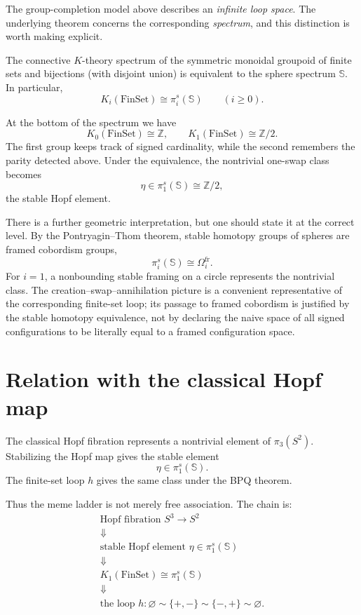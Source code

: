 The group-completion model above describes an \emph{infinite loop space}. The underlying theorem concerns the corresponding \emph{spectrum}, and this distinction is worth making explicit.

\begin{theorem}
The connective $K$-theory spectrum of the symmetric monoidal groupoid of finite sets and bijections (with disjoint union) is equivalent to the sphere spectrum $\mathbb S$. In particular,
\[
 K_i(\mathrm{FinSet})\cong\pi_i^s(\mathbb S)
 \qquad(i\ge0).
\]
\end{theorem}

At the bottom of the spectrum we have
\[
 K_0(\mathrm{FinSet})\cong\mathbb Z,\qquad
 K_1(\mathrm{FinSet})\cong\mathbb Z/2.
\]
The first group keeps track of signed cardinality, while the second remembers the parity detected above. Under the equivalence, the nontrivial one-swap class becomes
\[
 \eta\in\pi_1^s(\mathbb S)\cong\mathbb Z/2,
\]
the stable Hopf element.

There is a further geometric interpretation, but one should state it at the correct level. By the Pontryagin--Thom theorem, stable homotopy groups of spheres are framed cobordism groups,
\[
 \pi_i^s(\mathbb S)\cong\Omega_i^{\mathrm{fr}}.
\]
For $i=1$, a nonbounding stable framing on a circle represents the nontrivial class. The creation--swap--annihilation picture is a convenient representative of the corresponding finite-set loop; its passage to framed cobordism is justified by the stable homotopy equivalence, not by declaring the naive space of all signed configurations to be literally equal to a framed configuration space.

\section{Relation with the classical Hopf map}

The classical Hopf fibration represents a nontrivial element of \(\pi_3(S^2)\).  Stabilizing the Hopf map gives the stable element
\[
  \eta\in \pi_1^s(\mathbb S).
\]
The finite-set loop \(h\) gives the same class under the BPQ theorem.

Thus the meme ladder is not merely free association.  The chain is:
\[
\begin{array}{c}
\text{Hopf fibration }S^3\to S^2\\
\Downarrow\\
\text{stable Hopf element }\eta\in\pi_1^s(\mathbb S)\\
\Downarrow\\
K_1(\mathrm{FinSet})\cong\pi_1^s(\mathbb S)\\
\Downarrow\\
\text{the loop }h:\varnothing\sim\{+,-\}\sim\{-,+\}\sim\varnothing.
\end{array}
\]

